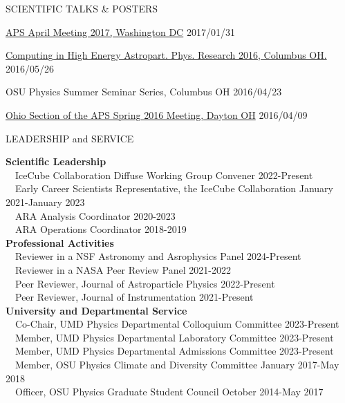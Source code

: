 \documentclass{resume} %
\begin{document}
\begin{rSection}{SCIENTIFIC TALKS \& POSTERS}
\begin{etaremune}
\item \href{http://meetings.aps.org/Meeting/APR17/Session/Y3.2}{APS April Meeting 2017, Washington DC} \hfill 2017/01/31
\item \href{http://ccapp.osu.edu/workshops/CHEAPR2016/workshop.html}{Computing in High Energy Astropart. Phys. Research 2016, Columbus OH.} \hfill 2016/05/26
\item OSU Physics Summer Seminar Series, Columbus OH \hfill 2016/04/23
\item \href{http://meetings.aps.org/Meeting/OSS16/Session/D3.6}{Ohio Section of the APS Spring 2016 Meeting, Dayton OH} \hfill 2016/04/09

\end{etaremune}
\end{rSection}
\newpage

\begin{rSection}{LEADERSHIP and SERVICE}

  \textbf{Scientific Leadership} \\
  \-\ \-\ IceCube Collaboration Diffuse Working Group Convener \hfill 2022-Present \\
  \-\ \-\ Early Career Scientists Representative, the IceCube Collaboration \hfill January 2021-January 2023 \\
  \-\ \-\ ARA Analysis Coordinator \hfill 2020-2023 \\
  \-\ \-\ ARA Operations Coordinator \hfill 2018-2019 \\

  \textbf{Professional Activities} \\
  \-\ \-\ Reviewer in a NSF Astronomy and Asrophysics Panel \hfill 2024-Present \\
  \-\ \-\ Reviewer in a NASA Peer Review Panel \hfill 2021-2022 \\
  \-\ \-\ Peer Reviewer, Journal of Astroparticle Physics \hfill 2022-Present \\
  \-\ \-\ Peer Reviewer, Journal of Instrumentation \hfill 2021-Present \\
  
  \textbf{University and Departmental Service} \\
  \-\ \-\ Co-Chair, UMD Physics Departmental Colloquium Committee \hfill 2023-Present \\
  \-\ \-\ Member, UMD Physics Departmental Laboratory Committee \hfill 2023-Present \\
  \-\ \-\ Member, UMD Physics Departmental Admissions Committee \hfill 2023-Present \\
  \-\ \-\ Member, OSU Physics Climate and Diversity Committee \hfill January 2017-May 2018\\
  \-\ \-\ Officer, OSU Physics Graduate Student Council \hfill October 2014-May 2017 \\

\end{rSection}
\end{document}
